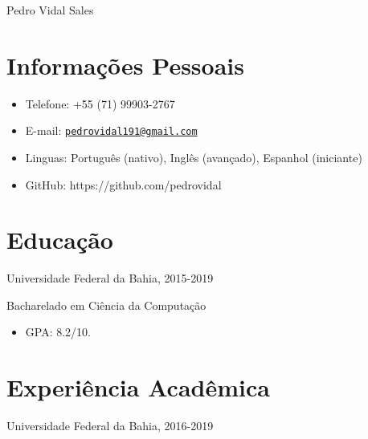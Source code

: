 \documentclass[letterpaper]{article}
\def\name{Pedro Vidal Sales}
\begin{document}
{\huge \name}


\vspace{0.25in}

    

\section*{Informações Pessoais}
    \begin{itemize}
        \item Telefone: +55 (71) 99903-2767
        \item E-mail: \href{mailto:pedrovidal191@gmail.com}{\tt pedrovidal191@gmail.com}
        \item Linguas: Português (nativo), Inglês (avançado), Espanhol (iniciante)
        \item GitHub: https://github.com/pedrovidal
    \end{itemize}

\section*{Educação}

  Universidade Federal da Bahia, 2015-2019
  
  Bacharelado em Ciência da Computação

  \begin{itemize}
    \item GPA: 8.2/10.
  \end{itemize}

\section*{Experiência Acadêmica}
  Universidade Federal da Bahia, 2016-2019
  
\end{document}
